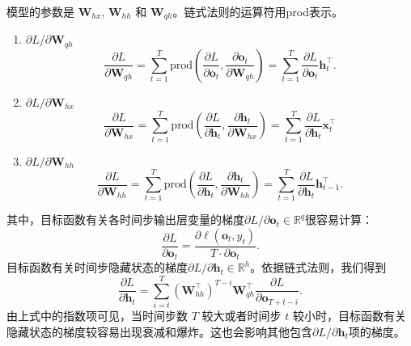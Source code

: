 模型的参数是 $\boldsymbol{W}_{hx}$, $\boldsymbol{W}_{hh}$ 和 $\boldsymbol{W}_{qh}$。链式法则的运算符用prod表示。
\begin{enumerate}
	\item $\partial L/\partial \boldsymbol{W}_{qh}$
	\begin{equation}
		\frac{\partial L}{\partial \boldsymbol{W}_{qh}} 
		= \sum_{t=1}^T \text{prod}\left(\frac{\partial L}{\partial \boldsymbol{o}_t}, \frac{\partial \boldsymbol{o}_t}{\partial \boldsymbol{W}_{qh}}\right) 
		= \sum_{t=1}^T \frac{\partial L}{\partial \boldsymbol{o}_t} \boldsymbol{h}_t^\top.
	\end{equation}
	\item $\partial L/\partial \boldsymbol{W}_{hx}$
	\begin{equation}
		\frac{\partial L}{\partial \boldsymbol{W}_{hx}} 
		= \sum_{t=1}^T \text{prod}\left(\frac{\partial L}{\partial \boldsymbol{h}_t}, \frac{\partial \boldsymbol{h}_t}{\partial \boldsymbol{W}_{hx}}\right) 
		= \sum_{t=1}^T \frac{\partial L}{\partial \boldsymbol{h}_t} \boldsymbol{x}_t^\top
	\end{equation}
	\item $\partial L/\partial \boldsymbol{W}_{hh}$
	\begin{equation}
		\frac{\partial L}{\partial \boldsymbol{W}_{hh}} 
		= \sum_{t=1}^T \text{prod}\left(\frac{\partial L}{\partial \boldsymbol{h}_t}, \frac{\partial \boldsymbol{h}_t}{\partial \boldsymbol{W}_{hh}}\right) 
		= \sum_{t=1}^T \frac{\partial L}{\partial \boldsymbol{h}_t} \boldsymbol{h}_{t-1}^\top.
	\end{equation}
\end{enumerate}
其中，目标函数有关各时间步输出层变量的梯度$\partial L/\partial \boldsymbol{o}_t \in \mathbb{R}^q$很容易计算：
\begin{equation}
	\frac{\partial L}{\partial \boldsymbol{o}_t} =  \frac{\partial \ell (\boldsymbol{o}_t, y_t)}{T \cdot \partial \boldsymbol{o}_t}.	
\end{equation}
目标函数有关时间步隐藏状态的梯度$\partial L/\partial \boldsymbol{h}_t \in \mathbb{R}^h$。依据链式法则，我们得到
\begin{equation}
	\frac{\partial L}{\partial \boldsymbol{h}_t} 
	= \sum_{i=t}^T {\left(\boldsymbol{W}_{hh}^\top\right)}^{T-i} \boldsymbol{W}_{qh}^\top \frac{\partial L}{\partial \boldsymbol{o}_{T+t-i}}.
\end{equation}
由上式中的指数项可见，当时间步数 $T$ 较大或者时间步 $t$ 较小时，目标函数有关隐藏状态的梯度较容易出现衰减和爆炸。这也会影响其他包含$\partial L / \partial \boldsymbol{h}_t$项的梯度。

